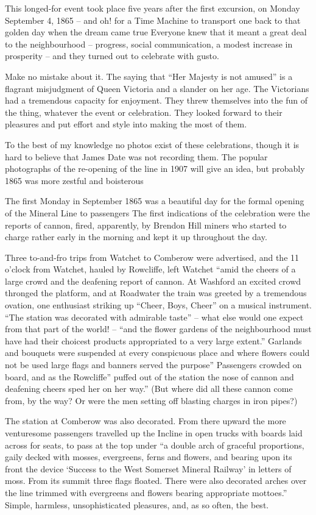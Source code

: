 \documentclass[10pt,a4paper]{article}
\begin{document}
This longed-for event took place five years after the first excursion, on Monday September 4, 1865 – and oh! for a Time Machine to transport one back to that golden day when the dream came true Everyone knew that it meant a great deal to the neighbourhood  -- progress, social communication, a modest increase in prosperity – and they turned out to celebrate with gusto.

Make no mistake about it. The saying that “Her Majesty is not amused” is a flagrant misjudgment of Queen Victoria and a slander on her age. The Victorians had a tremendous capacity for enjoyment. They threw themselves into the fun of the thing, whatever the event or celebration. They looked forward to their pleasures and put effort and style into making the most of them.

To the best of my knowledge no photos exist of these celebrations, though it is hard to believe that James Date was not recording them. The popular photographs of the re-opening of the line in 1907 will give an idea, but probably 1865 was more zestful and boisterous

The first Monday in September 1865 was a beautiful day for the formal opening of the Mineral Line to passengers The first indications of the celebration were the reports of cannon, fired, apparently, by Brendon Hill miners who started to charge rather early in the morning and kept it up  throughout the day.

Three to-and-fro trips from Watchet to Comberow were advertised, and the 11 o’clock from Watchet,   hauled by Rowcliffe,  left Watchet “amid the cheers of  a large crowd and the deafening report  of cannon. At Washford an excited crowd thronged the platform, and at Roadwater the train was greeted by a tremendous ovation, one enthusiast striking up “Cheer, Boys, Cheer” on a musical instrument. “The station was decorated with admirable taste” – what else would one expect from that part of the world!  – “and the flower gardens of the neighbourhood must have had their choicest products appropriated  to a very large extent.” Garlands and bouquets were suspended at every conspicuous place  and where flowers could not be used large flags and banners served the purpose” Passengers crowded on board, and as the Rowcliffe” puffed out of the station the nose of cannon and deafening cheers sped her on her way.” (But where did all these cannon come from, by the way? Or were the men setting off blasting charges in iron pipes?)

The station at Comberow was also decorated. From there upward the more venturesome passengers travelled up the Incline in open trucks with boards laid across for seats, to pass at the top under “a double arch of graceful proportions, gaily decked with mosses, evergreens, ferns  and flowers, and bearing upon its front the device  ‘Success to the West Somerset Mineral Railway’ in letters of moss. From its summit three flags floated.  There were also decorated arches over the line trimmed with evergreens and flowers bearing appropriate mottoes.” Simple, harmless, unsophisticated pleasures, and, as so often, the best.
\end{document}
